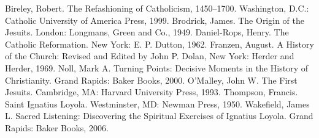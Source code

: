 \begin{readinglist}
\entry *Bireley, Robert. The Refashioning of Catholicism, 1450–1700. Washington, D.C.: Catholic
  University of America Press, 1999.
\entry Brodrick, James. The Origin of the Jesuits. London: Longmans, Green and Co., 1949.
\entry Daniel-Rops, Henry. The Catholic Reformation. New York: E. P. Dutton, 1962.
\entry Franzen, August. A History of the Church: Revised and Edited by John P. Dolan, New York:
  Herder and Herder, 1969.
\entry Noll, Mark A. Turning Points: Decisive Moments in the History of Christianity. Grand Rapids:
  Baker Books, 2000.
\entry *O’Malley, John W. The First Jesuits. Cambridge, MA: Harvard University Press, 1993.
\entry Thompson, Francis. Saint Ignatius Loyola. Westminster, MD: Newman Press, 1950.
\entry Wakefield, James L. Sacred Listening: Discovering the Spiritual Exercises of Ignatius Loyola.
  Grand Rapids: Baker Books, 2006.
\end{readinglist}
